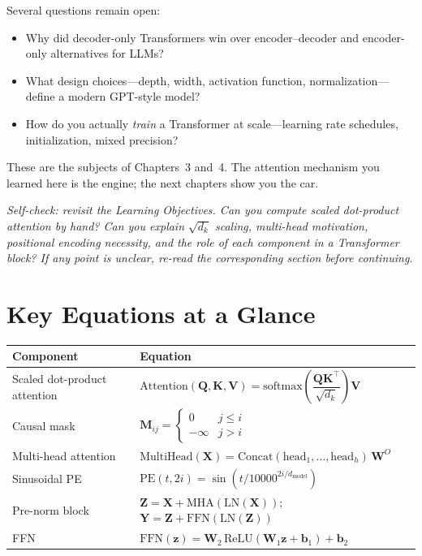 Several questions remain open:

\begin{itemize}[nosep]
    \item Why did decoder-only Transformers win over encoder--decoder and encoder-only alternatives for LLMs?
    \item What design choices---depth, width, activation function, normalization---define a modern GPT-style model?
    \item How do you actually \emph{train} a Transformer at scale---learning rate schedules, initialization, mixed precision?
\end{itemize}

These are the subjects of Chapters~3 and~4. The attention mechanism you learned here is the engine; the next chapters show you the car.

\medskip
\noindent\textit{Self-check: revisit the Learning Objectives. Can you compute scaled dot-product attention by hand? Can you explain $\sqrt{d_k}$ scaling, multi-head motivation, positional encoding necessity, and the role of each component in a Transformer block? If any point is unclear, re-read the corresponding section before continuing.}


\section*{Key Equations at a Glance}

\begin{center}
\renewcommand{\arraystretch}{1.6}
\begin{tabularx}{\textwidth}{@{}lX@{}}
\toprule
Component & Equation \\
\midrule
Scaled dot-product attention & $\text{Attention}(\mathbf{Q}, \mathbf{K}, \mathbf{V}) = \text{softmax}\!\left(\dfrac{\mathbf{Q}\mathbf{K}^\top}{\sqrt{d_k}}\right) \mathbf{V}$ \\[4pt]
Causal mask & $\mathbf{M}_{ij} = \begin{cases} 0 & j \leq i \\ -\infty & j > i \end{cases}$ \\[4pt]
Multi-head attention & $\text{MultiHead}(\mathbf{X}) = \text{Concat}(\text{head}_1, \ldots, \text{head}_h)\, \mathbf{W}^O$ \\[4pt]
Sinusoidal PE & $\text{PE}(t, 2i) = \sin(t / 10000^{2i/d_{\text{model}}})$ \\[4pt]
Pre-norm block & $\mathbf{Z} = \mathbf{X} + \text{MHA}(\text{LN}(\mathbf{X}))$; $\mathbf{Y} = \mathbf{Z} + \text{FFN}(\text{LN}(\mathbf{Z}))$ \\[4pt]
FFN & $\text{FFN}(\mathbf{z}) = \mathbf{W}_2 \,\text{ReLU}(\mathbf{W}_1 \mathbf{z} + \mathbf{b}_1) + \mathbf{b}_2$ \\
\bottomrule
\end{tabularx}
\end{center}


